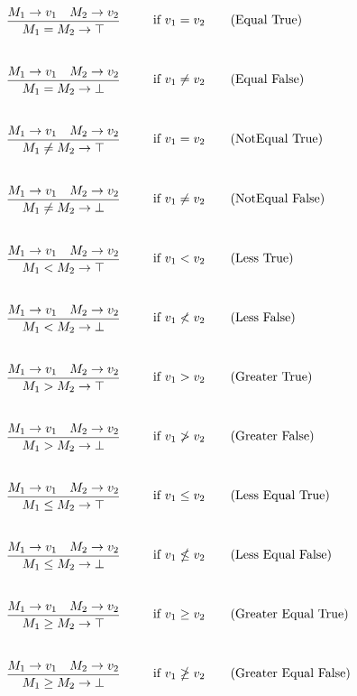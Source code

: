 \begin{align*}
\infrule{M_1 \ra v_1 \quad M_2 \ra v_2}{M_1 = M_2 \ra \top}& \text{if }v_1=v_2 \tag{Equal True}\\
\infrule{M_1 \ra v_1 \quad M_2 \ra v_2}{M_1 = M_2 \ra \bot}& \text{if }v_1\neq v_2 \tag{Equal False}\\
\infrule{M_1 \ra v_1 \quad M_2 \ra v_2}{M_1 \neq M_2 \ra \top}& \text{if }v_1=v_2 \tag{NotEqual True}\\
\infrule{M_1 \ra v_1 \quad M_2 \ra v_2}{M_1 \neq M_2 \ra \bot}& \text{if }v_1\neq v_2 \tag{NotEqual False}\\
\infrule{M_1 \ra v_1 \quad M_2 \ra v_2}{M_1 < M_2 \ra \top}& \text{if }v_1<v_2 \tag{Less True}\\
\infrule{M_1 \ra v_1 \quad M_2 \ra v_2}{M_1 < M_2 \ra \bot}& \text{if }v_1\nless v_2 \tag{Less False}\\
\infrule{M_1 \ra v_1 \quad M_2 \ra v_2}{M_1 > M_2 \ra \top}& \text{if }v_1>v_2 \tag{Greater True}\\
\infrule{M_1 \ra v_1 \quad M_2 \ra v_2}{M_1 > M_2 \ra \bot}& \text{if }v_1\ngtr v_2 \tag{Greater False}\\
\infrule{M_1 \ra v_1 \quad M_2 \ra v_2}{M_1 \leq M_2 \ra \top}& \text{if }v_1\leq v_2 \tag{Less Equal True}\\
\infrule{M_1 \ra v_1 \quad M_2 \ra v_2}{M_1 \leq M_2 \ra \bot}& \text{if }v_1\nleq v_2 \tag{Less Equal False}\\
\infrule{M_1 \ra v_1 \quad M_2 \ra v_2}{M_1 \geq M_2 \ra \top}& \text{if }v_1\geq v_2 \tag{Greater Equal True}\\
\infrule{M_1 \ra v_1 \quad M_2 \ra v_2}{M_1 \geq M_2 \ra \bot}& \text{if }v_1\ngeq v_2 \tag{Greater Equal False}
\end{align*}
	

\FloatBarrier



